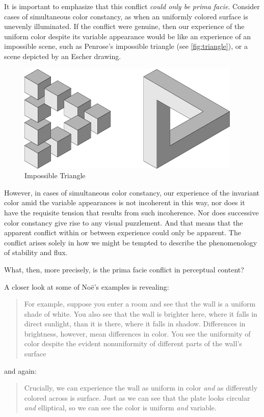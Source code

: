 \documentclass[12pt]{article}
\begin{document}
It is important to emphasize that this conflict \emph{could only be prima facie}. Consider cases of simultaneous color constancy, as when an uniformly colored surface is unevenly illuminated. If the conflict were genuine, then our experience of the uniform color despite its variable appearance would be like an experience of an impossible scene, such as Penrose's \citeyearpar{Penrose:1958kx} impossible triangle (see \autoref{fig:triangle}), or a scene depicted by an Escher drawing.
	\begin{figure}[htbp]
		\centering
			\includegraphics[scale=1]{triangle.jpg}
		\caption{Impossible Triangle}
		\label{fig:triangle}
	\end{figure}
However, in cases of simultaneous color constancy, our experience of the invariant color amid the variable appearances is not incoherent in this way, nor does it have the requisite tension that results from such incoherence. Nor does successive color constancy give rise to any visual puzzlement. And that means that the apparent conflict within or between experience could only be apparent. The conflict arises solely in how we might be tempted to describe the phenomenology of stability and flux. 

What, then, more precisely, is the prima facie conflict in perceptual content? 

A closer look at some of Noë's examples is revealing:
	\begin{quote}
		For example, suppose you enter a room and see that the wall is a uniform shade of white. You also see that the wall is brighter here, where it falls in direct sunlight, than it is there, where it falls in shadow. Differences in brightness, however, mean differences in color. You see the uniformity of color despite the evident nonuniformity of different parts of the wall's surface \citep[127]{Noe:2004fk}
	\end{quote}
and again:
	\begin{quote}
		Crucially, we can experience the wall as uniform in color \emph{and} as differently colored across is surface. Just as we can see that the plate looks circular \emph{and} elliptical, so we can see the color is uniform \emph{and} variable. \citep[129]{Noe:2004fk}
	\end{quote}
\end{document}

